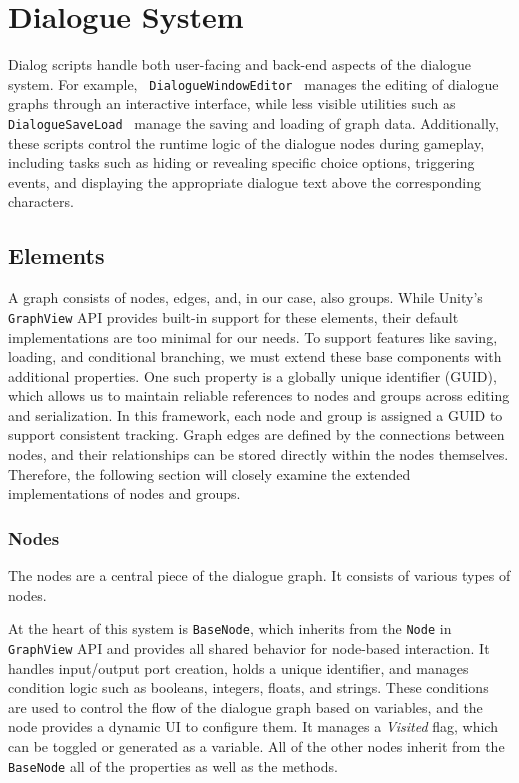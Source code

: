 \section{Dialogue System}
Dialog scripts handle both user-facing and back-end aspects of the dialogue system. For example, \verb | DialogueWindowEditor | manages the editing of dialogue graphs through an interactive interface, while less visible utilities such as \verb | DialogueSaveLoad | manage the saving and loading of graph data. Additionally, these scripts control the runtime logic of the dialogue nodes during gameplay, including tasks such as hiding or revealing specific choice options, triggering events, and displaying the appropriate dialogue text above the corresponding characters. 

\subsection{Elements}
A graph consists of nodes, edges, and, in our case, also groups. While Unity’s \verb|GraphView| API provides built-in support for these elements, their default implementations are too minimal for our needs. To support features like saving, loading, and conditional branching, we must extend these base components with additional properties. One such property is a globally unique identifier (GUID), which allows us to maintain reliable references to nodes and groups across editing and serialization. In this framework, each node and group is assigned a GUID to support consistent tracking. Graph edges are defined by the connections between nodes, and their relationships can be stored directly within the nodes themselves. Therefore, the following section will closely examine the extended implementations of nodes and groups.


\subsubsection{Nodes}
The nodes are a central piece of the dialogue graph. It consists of various types of nodes.

At the heart of this system is \verb|BaseNode|, which inherits from the \verb|Node| in \verb|GraphView| API and provides all shared behavior for node-based interaction. It handles input/output port creation, holds a unique identifier, and manages condition logic such as booleans, integers, floats, and strings. These conditions are used to control the flow of the dialogue graph based on variables, and the node provides a dynamic UI to configure them. It manages a \textit{Visited} flag, which can be toggled or generated as a variable. All of the other nodes inherit from the \verb|BaseNode| all of the properties as well as the methods.

